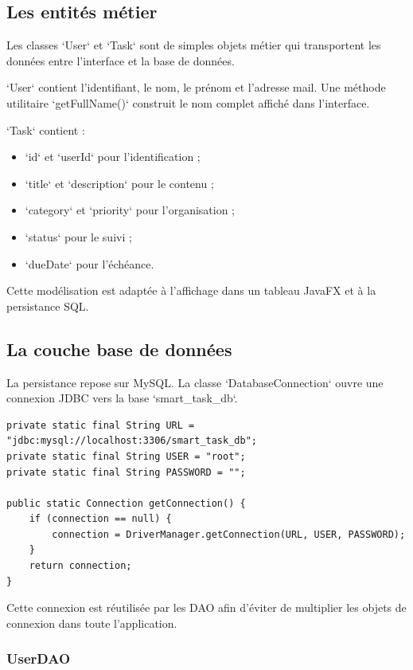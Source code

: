 \documentclass[11pt,a4paper]{article}
\begin{document}
\subsection{Les entités métier}

Les classes `User` et `Task` sont de simples objets métier qui transportent les données entre l'interface et la base de données.

`User` contient l'identifiant, le nom, le prénom et l'adresse mail. Une méthode utilitaire `getFullName()` construit le nom complet affiché dans l'interface.

`Task` contient :
\begin{itemize}[leftmargin=1.4em]
    \item `id` et `userId` pour l'identification ;
    \item `title` et `description` pour le contenu ;
    \item `category` et `priority` pour l'organisation ;
    \item `status` pour le suivi ;
    \item `dueDate` pour l'échéance.
\end{itemize}

Cette modélisation est adaptée à l'affichage dans un tableau JavaFX et à la persistance SQL.

\subsection{La couche base de données}

La persistance repose sur MySQL. La classe `DatabaseConnection` ouvre une connexion JDBC vers la base `smart_task_db`.

\begin{lstlisting}[style=javaStyle,caption={Connexion JDBC centralisée}]
private static final String URL = "jdbc:mysql://localhost:3306/smart_task_db";
private static final String USER = "root";
private static final String PASSWORD = "";

public static Connection getConnection() {
    if (connection == null) {
        connection = DriverManager.getConnection(URL, USER, PASSWORD);
    }
    return connection;
}
\end{lstlisting}

Cette connexion est réutilisée par les DAO afin d'éviter de multiplier les objets de connexion dans toute l'application.

\subsubsection{UserDAO}
\end{document}
